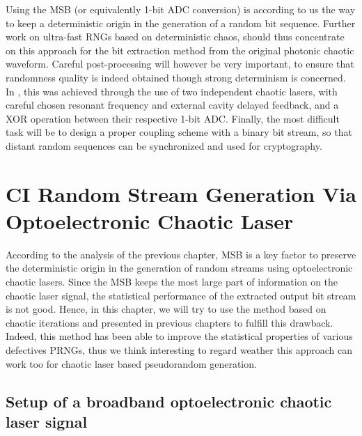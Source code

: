 Using the MSB (or equivalently 1-bit ADC conversion) is according to
us the way to keep a deterministic origin in the generation of a
random bit sequence. Further work on ultra-fast RNGs based on
deterministic chaos, should thus concentrate on this approach for the
bit extraction method from the original photonic chaotic
waveform. Careful post-processing will however be very important, to
ensure that randomness quality is indeed obtained though strong
determinism is concerned. In \cite{fast}, this was achieved through
the use of two independent chaotic lasers, with careful chosen
resonant frequency and external cavity delayed feedback, and a XOR
operation between their respective 1-bit ADC. Finally, the most
difficult task will be to design a proper coupling scheme with a
binary bit stream, so that distant random sequences can be
synchronized and used for cryptography.





\chapter{CI Random Stream Generation Via Optoelectronic Chaotic Laser}
\label{CI Random Stream Generation Via Optoelectronic Chaotic Laser}

According to the analysis of the previous chapter, MSB is a key factor to preserve
 the deterministic origin in the generation of random streams using optoelectronic
chaotic lasers. Since the MSB keeps the most large part of information on the chaotic laser signal, the statistical performance of the extracted output bit stream is not good.
Hence, in this chapter, we will try to use the method based on chaotic iterations
and presented in previous chapters to fulfill this drawback.
Indeed, this method has been able to improve the statistical properties of
various defectives PRNGs, thus we think interesting to regard weather this
approach can work too for chaotic laser based pseudorandom generation.

\section{Setup of a broadband optoelectronic chaotic laser signal}

